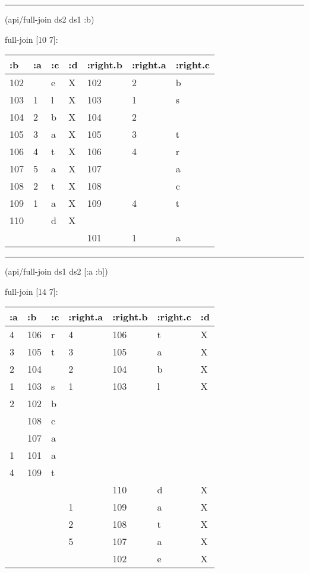 \documentclass[]{article}
\newenvironment{Shaded}{\begin{snugshade}}{\end{snugshade}}
\newcommand{\AttributeTok}[1]{\textcolor[rgb]{0.77,0.63,0.00}{#1}}
\newcommand{\NormalTok}[1]{#1}
\begin{document}
\begin{center}\rule{0.5\linewidth}{0.5pt}\end{center}

\begin{Shaded}
\begin{Highlighting}[]
\NormalTok{(api/full-join ds2 ds1 }\AttributeTok{:b}\NormalTok{)}
\end{Highlighting}
\end{Shaded}

full-join {[}10 7{]}:

\begin{longtable}[]{@{}lllllll@{}}
\toprule
:b & :a & :c & :d & :right.b & :right.a & :right.c\tabularnewline
\midrule
\endhead
102 & & e & X & 102 & 2 & b\tabularnewline
103 & 1 & l & X & 103 & 1 & s\tabularnewline
104 & 2 & b & X & 104 & 2 &\tabularnewline
105 & 3 & a & X & 105 & 3 & t\tabularnewline
106 & 4 & t & X & 106 & 4 & r\tabularnewline
107 & 5 & a & X & 107 & & a\tabularnewline
108 & 2 & t & X & 108 & & c\tabularnewline
109 & 1 & a & X & 109 & 4 & t\tabularnewline
110 & & d & X & & &\tabularnewline
& & & & 101 & 1 & a\tabularnewline
\bottomrule
\end{longtable}

\begin{center}\rule{0.5\linewidth}{0.5pt}\end{center}

\begin{Shaded}
\begin{Highlighting}[]
\NormalTok{(api/full-join ds1 ds2 [}\AttributeTok{:a} \AttributeTok{:b}\NormalTok{])}
\end{Highlighting}
\end{Shaded}

full-join {[}14 7{]}:

\begin{longtable}[]{@{}lllllll@{}}
\toprule
:a & :b & :c & :right.a & :right.b & :right.c & :d\tabularnewline
\midrule
\endhead
4 & 106 & r & 4 & 106 & t & X\tabularnewline
3 & 105 & t & 3 & 105 & a & X\tabularnewline
2 & 104 & & 2 & 104 & b & X\tabularnewline
1 & 103 & s & 1 & 103 & l & X\tabularnewline
2 & 102 & b & & & &\tabularnewline
& 108 & c & & & &\tabularnewline
& 107 & a & & & &\tabularnewline
1 & 101 & a & & & &\tabularnewline
4 & 109 & t & & & &\tabularnewline
& & & & 110 & d & X\tabularnewline
& & & 1 & 109 & a & X\tabularnewline
& & & 2 & 108 & t & X\tabularnewline
& & & 5 & 107 & a & X\tabularnewline
& & & & 102 & e & X\tabularnewline
\bottomrule
\end{longtable}
\end{document}
